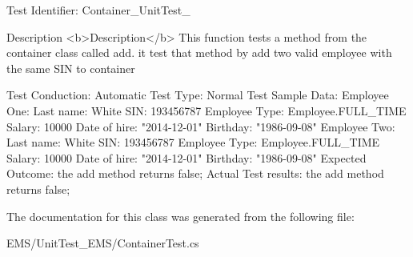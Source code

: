Test Identifier\-: Container\-\_\-\-Unit\-Test\-\_ \begin{DoxyVerb}Description <b>Description</b> This function tests a method from 
             the container class called add. it test that 
             method by add two valid employee with the same SIN to container

             Test Conduction: Automatic
             Test Type: Normal Test
             Sample Data: 
             Employee One:
                 Last name: White
                 SIN: 193456787
                 Employee Type: Employee.FULL_TIME
                 Salary: 10000
                 Date of hire: "2014-12-01"
                 Birthday: "1986-09-08" 
             Employee Two:
                 Last name: White
                 SIN: 193456787
                 Employee Type: Employee.FULL_TIME
                 Salary: 10000
                 Date of hire: "2014-12-01"
                 Birthday: "1986-09-08"    
             Expected Outcome: the add method returns false;
             Actual Test results: the add method returns false;
\end{DoxyVerb}
 

The documentation for this class was generated from the following file\-:\begin{DoxyCompactItemize}
\item 
E\-M\-S/\-Unit\-Test\-\_\-\-E\-M\-S/Container\-Test.\-cs\end{DoxyCompactItemize}
